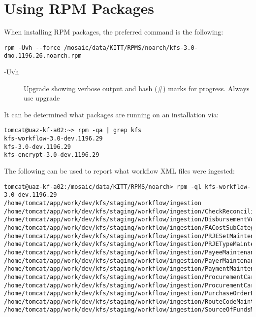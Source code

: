 \documentclass[12pt,notitlepage]{article}
\begin{document}
\section{Using RPM Packages}
When installing RPM packages, the preferred command is the following:
\begin{lstlisting}
rpm -Uvh --force /mosaic/data/KITT/RPMS/noarch/kfs-3.0-dmo.1196.26.noarch.rpm
\end{lstlisting}

\begin{description}
  \item[-Uvh] Upgrade showing verbose output and hash (\#) marks for progress. Always use upgrade
\end{description}

It can be determined what packages are running on an installation via:

\begin{lstlisting}
tomcat@uaz-kf-a02:~> rpm -qa | grep kfs
kfs-workflow-3.0-dev.1196.29
kfs-3.0-dev.1196.29
kfs-encrypt-3.0-dev.1196.29
\end{lstlisting}

The following can be used to report what workflow XML files were ingested:

\lstset{basicstyle=\tiny,
  breaklines=true,
  includerangemarker=false}
\begin{lstlisting}
tomcat@uaz-kf-a02:/mosaic/data/KITT/RPMS/noarch> rpm -ql kfs-workflow-3.0-dev.1196.29
/home/tomcat/app/work/dev/kfs/staging/workflow/ingestion
/home/tomcat/app/work/dev/kfs/staging/workflow/ingestion/CheckReconciliationMaintenanceDocument.xml
/home/tomcat/app/work/dev/kfs/staging/workflow/ingestion/DisbursementVoucherBatchDefaultMaintenanceDocument.xml
/home/tomcat/app/work/dev/kfs/staging/workflow/ingestion/FACostSubCategoryMaintenanceDocument.xml
/home/tomcat/app/work/dev/kfs/staging/workflow/ingestion/PRJESetMaintenance.xml
/home/tomcat/app/work/dev/kfs/staging/workflow/ingestion/PRJETypeMaintenance.xml
/home/tomcat/app/work/dev/kfs/staging/workflow/ingestion/PayeeMaintenanceDocument.xml
/home/tomcat/app/work/dev/kfs/staging/workflow/ingestion/PayerMaintenanceDocument.xml
/home/tomcat/app/work/dev/kfs/staging/workflow/ingestion/PaymentMaintenanceDocument.xml
/home/tomcat/app/work/dev/kfs/staging/workflow/ingestion/ProcurementCardDocument.xml
/home/tomcat/app/work/dev/kfs/staging/workflow/ingestion/ProcurementCardHolderDetailMaintenanceDocument.xml
/home/tomcat/app/work/dev/kfs/staging/workflow/ingestion/PurchaseOrderBatchDefaultMaintenanceDocument.xml
/home/tomcat/app/work/dev/kfs/staging/workflow/ingestion/RouteCodeMaintenanceDocument.xml
/home/tomcat/app/work/dev/kfs/staging/workflow/ingestion/SourceOfFundsMaintenanceDocument.xml
\end{lstlisting}
\end{document}
